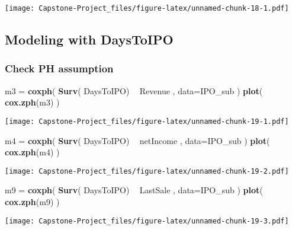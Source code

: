 \documentclass[]{article}
\newenvironment{Shaded}{\begin{snugshade}}{\end{snugshade}}
\newcommand{\DataTypeTok}[1]{\textcolor[rgb]{0.13,0.29,0.53}{#1}}
\newcommand{\KeywordTok}[1]{\textcolor[rgb]{0.13,0.29,0.53}{\textbf{#1}}}
\newcommand{\NormalTok}[1]{#1}
\newcommand{\OperatorTok}[1]{\textcolor[rgb]{0.81,0.36,0.00}{\textbf{#1}}}
\newcommand{\StringTok}[1]{\textcolor[rgb]{0.31,0.60,0.02}{#1}}
\begin{document}
\texttt{[image: Capstone-Project\_files/figure-latex/unnamed-chunk-18-1.pdf]}

\hypertarget{modeling-with-daystoipo}{%
\subsection{Modeling with DaysToIPO}\label{modeling-with-daystoipo}}

\hypertarget{check-ph-assumption}{%
\subsubsection{Check PH assumption}\label{check-ph-assumption}}

\begin{Shaded}
\begin{Highlighting}[]
\NormalTok{m3 =}\StringTok{ }\KeywordTok{coxph}\NormalTok{( }\KeywordTok{Surv}\NormalTok{( DaysToIPO) }\OperatorTok{~}\StringTok{ }\NormalTok{Revenue , }\DataTypeTok{data=}\NormalTok{IPO_sub )}
\KeywordTok{plot}\NormalTok{( }\KeywordTok{cox.zph}\NormalTok{(m3) )}
\end{Highlighting}
\end{Shaded}

\texttt{[image: Capstone-Project\_files/figure-latex/unnamed-chunk-19-1.pdf]}

\begin{Shaded}
\begin{Highlighting}[]
\NormalTok{m4 =}\StringTok{ }\KeywordTok{coxph}\NormalTok{( }\KeywordTok{Surv}\NormalTok{( DaysToIPO) }\OperatorTok{~}\StringTok{ }\NormalTok{netIncome , }\DataTypeTok{data=}\NormalTok{IPO_sub )}
\KeywordTok{plot}\NormalTok{( }\KeywordTok{cox.zph}\NormalTok{(m4) )}
\end{Highlighting}
\end{Shaded}

\texttt{[image: Capstone-Project\_files/figure-latex/unnamed-chunk-19-2.pdf]}

\begin{Shaded}
\begin{Highlighting}[]
\NormalTok{m9 =}\StringTok{ }\KeywordTok{coxph}\NormalTok{( }\KeywordTok{Surv}\NormalTok{( DaysToIPO) }\OperatorTok{~}\StringTok{ }\NormalTok{LastSale , }\DataTypeTok{data=}\NormalTok{IPO_sub )}
\KeywordTok{plot}\NormalTok{( }\KeywordTok{cox.zph}\NormalTok{(m9) )}
\end{Highlighting}
\end{Shaded}

\texttt{[image: Capstone-Project\_files/figure-latex/unnamed-chunk-19-3.pdf]}
\end{document}
